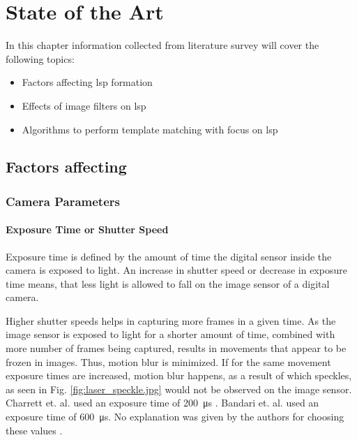 \chapter{State of the Art}\label{Chap:Sota}
In this chapter information collected from literature survey will cover the following topics:

\begin{itemize}
    \item Factors affecting \gls{lsp} formation
    \item Effects of image filters on \gls{lsp}
    \item Algorithms to perform template matching with focus on \gls{lsp}
\end{itemize}

\section{Factors affecting }

\subsection{Camera Parameters}

    \subsubsection*{Exposure Time or Shutter Speed}\label{Subsubsection:Exposure_Time}
    Exposure time is defined by the amount of time the digital sensor inside the camera is exposed to light. An increase in shutter speed or decrease in exposure time means, that less light is allowed to fall on the image sensor of a digital camera.

    \vspace{5mm}
    \noindent Higher shutter speeds helps in capturing more frames in a given time. As the image sensor is exposed to light for a shorter amount of time, combined with more number of frames being captured, results in movements that appear to be frozen in images. Thus, motion blur is minimized. If for the same movement exposure times are increased, motion blur happens, as a result of which speckles, as seen in Fig. \ref{fig:laser_speckle.jpg} would not be observed on the image sensor. Charrett et. al.  used an exposure time of \SI{200}{\micro\second} \cite{charrett_2018}. Bandari et. al. used an exposure time of \SI{600}{\micro\second}. No explanation was given by the authors for choosing these values \cite{bandari}.

